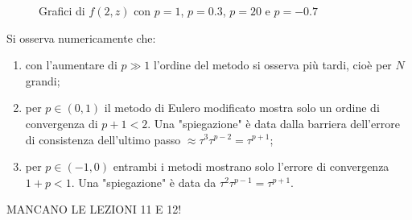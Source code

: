 \documentclass[hidelinks, 10pt]{report}
\begin{document}
\begin{center}
\begin{figure}[H]

\caption{Grafici di $ f(2, z) $ con $ p = 1 $, $ p = 0.3 $, $ p = 20 $ e $ p = -0.7 $}
\end{figure}
\end{center}

Si osserva numericamente che:
\begin{enumerate}
\item con l'aumentare di $ p \gg 1 $ l'ordine del metodo si osserva pi\`u tardi, cio\`e per $ N $ grandi;
\item per $ p \in (0, 1) $ il metodo di Eulero modificato mostra solo un ordine di convergenza di $ p + 1 < 2 $. Una "spiegazione" \`e data dalla barriera dell'errore di consistenza dell'ultimo passo $ \approx \tau^{3} \tau^{p - 2} = \tau^{p + 1} $;
\item per $ p \in (-1, 0) $ entrambi i metodi mostrano solo l'errore di convergenza $ 1 + p < 1 $. Una "spiegazione" \`e data da $ \tau^{2} \tau^{p - 1} = \tau^{p + 1} $.
\end{enumerate}


										MANCANO LE LEZIONI 11 E 12!

\end{document}
